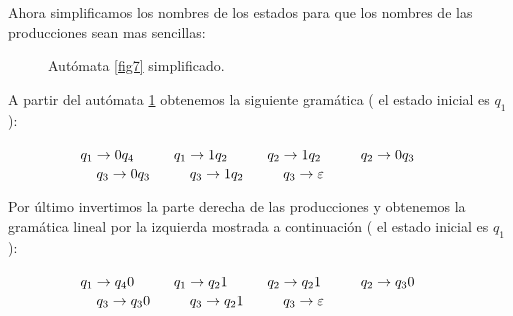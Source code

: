 Ahora simplificamos los nombres de los estados para que los nombres de las producciones sean mas sencillas:

\begin{figure}[H]
\centering
{}
\caption{Autómata \ref{fig7} simplificado.} \label{fig8}
\end{figure}

\vspace{1em} A partir del autómata \ref{fig8} obtenemos la siguiente gramática ( el estado inicial es $q_1$ ): \vspace{0.5em} \newline

$\hspace*{1.8cm}q_1\rightarrow 0q_4 \hspace{1cm} q_1\rightarrow 1q_2  \hspace{1cm} q_2\rightarrow 1q_2\hspace{1cm}  q_2\rightarrow 0q_3 $\newline
$\hspace*{2.2cm} q_3\rightarrow 0q_3  \hspace{1cm} q_3\rightarrow 1q_2 \hspace{1cm} q_3\rightarrow \varepsilon  $\vspace{2em}

Por último invertimos la parte derecha de las producciones y obtenemos la gramática lineal por la izquierda mostrada a continuación  ( el estado inicial es $q_1$ ): \vspace{0.5em} \newline

$\hspace*{1.8cm}q_1\rightarrow q_40 \hspace{1cm} q_1\rightarrow q_21  \hspace{1cm} q_2\rightarrow q_21\hspace{1cm}  q_2\rightarrow q_30 $\newline
$\hspace*{2.2cm} q_3\rightarrow q_30  \hspace{1cm} q_3\rightarrow q_21 \hspace{1cm} q_3\rightarrow \varepsilon  $\vspace{2em}


